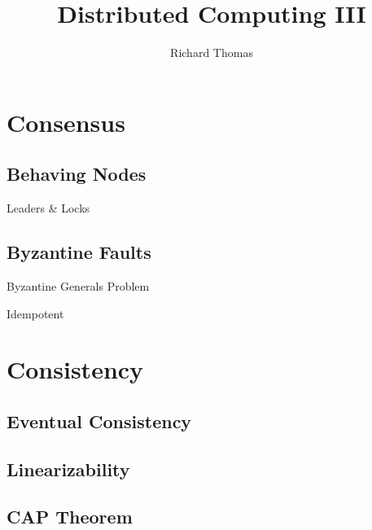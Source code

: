 \title{Distributed Computing III}
\author{Richard Thomas}
\date{}

\maketitle

\section{Consensus}

\subsection{Behaving Nodes}
Leaders \& Locks

\subsection{Byzantine Faults}
Byzantine Generals Problem

Idempotent

\section{Consistency}

\subsection{Eventual Consistency}

\subsection{Linearizability}

\subsection{CAP Theorem}

